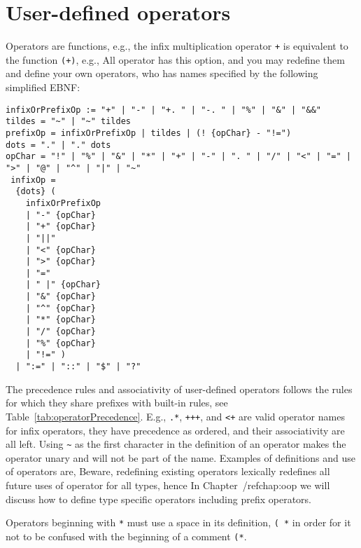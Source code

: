 \section{User-defined operators}
\label{sec:operators}
Operators are functions, e.g., the infix multiplication operator \lstinline!+! is equivalent to the function \lstinline!(+)!, e.g.,
%
%
All operator has this option, and you may redefine them and define your own operators, who has names specified by the following simplified EBNF:
\begin{lstlisting}[language=ebnf, caption={Grammar for infix and prefix lexemes},label=list:infixOrPrefixOperators]
infixOrPrefixOp := "+" | "-" | "+. " | "-. " | "%" | "&" | "&&"
tildes = "~" | "~" tildes
prefixOp = infixOrPrefixOp | tildes | (! {opChar} - "!=")
dots = "." | "." dots
opChar = "!" | "%" | "&" | "*" | "+" | "-" | ". " | "/" | "<" | "=" | ">" | "@" | "^" | "|" | "~" 
 infixOp = 
  {dots} (
    infixOrPrefixOp  
    | "-" {opChar} 
    | "+" {opChar} 
    | "||" 
    | "<" {opChar} 
    | ">" {opChar} 
    | "="  
    | " |" {opChar} 
    | "&" {opChar} 
    | "^" {opChar} 
    | "*" {opChar} 
    | "/" {opChar} 
    | "%" {opChar} 
    | "!=" )
  | ":=" | "::" | "$" | "?"
\end{lstlisting}
The precedence rules and associativity of user-defined operators follows the rules for which they share prefixes with built-in rules, see Table~\ref{tab:operatorPrecedence}. E.g., \lstinline!.*!, \lstinline!+++!, and \lstinline!<+! are valid operator names for infix operators, they have precedence as ordered, and their associativity are all left. Using \lstinline!~! as the first character in the definition of an operator makes the operator unary and will not be part of the name. Examples of definitions and use of operators are,
%
%
Beware, redefining existing operators lexically redefines all future uses of operator for all types, hence  In Chapter~/ref{chap:oop} we will discuss how to define type specific operators including prefix operators. 

Operators beginning with \lstinline!*! must use a space in its definition, \lstinline!( *! in order for it not to be confused with the beginning of a comment \lstinline!(*!. 

